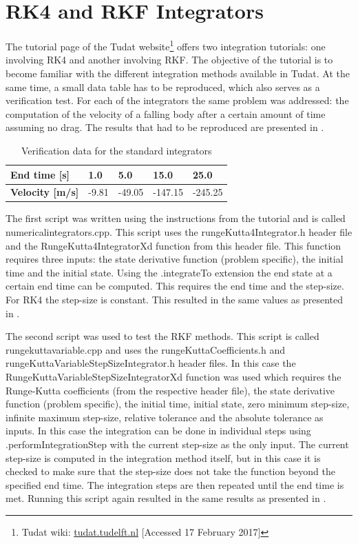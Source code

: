 \section{\acs{RK4} and \acs{RKF} Integrators}
\label{sec:rkandrkfver}
The tutorial page of the \ac{Tudat} website\footnote{\label{foot:tudatWiki2} Tudat wiki: \url{tudat.tudelft.nl} [Accessed 17 February 2017] } offers two integration tutorials: one involving \ac{RK4} and another involving \ac{RKF}. The objective of the tutorial is to become familiar with the different integration methods available in \ac{Tudat}. At the same time, a small data table has to be reproduced, which also serves as a verification test. For each of the integrators the same problem was addressed: the computation of the velocity of a falling body after a certain amount of time assuming no drag. The results that had to be reproduced are presented in .


\begin{table}[H]
\begin{center}
\caption{Verification data for the standard integrators}
\label{tab:intverdat}
\begin{tabular}{|l|l|l|l|l|}
\hline 
\textbf{End time [s]} & 1.0	& 5.0 & 15.0 & 25.0 \\ \hline 
\textbf{Velocity [m/s]} & -9.81 & -49.05 & -147.15 & -245.25 \\ \hline
\end{tabular}
\end{center}
\end{table}

\noindent
The first script was written using the instructions from the tutorial and is called numericalintegrators.cpp. This script uses the rungeKutta4Integrator.h header file and the RungeKutta4IntegratorXd function from this header file. This function requires three inputs: the state derivative function (problem specific), the initial time and the initial state. Using the .integrateTo extension the end state at a certain end time can be computed. This requires the end time and the step-size. For \ac{RK4} the step-size is constant. This resulted in the same values as presented in .


The second script was used to test the \ac{RKF} methods. This script is called rungekuttavariable.cpp and uses the rungeKuttaCoefficients.h and rungeKuttaVariableStepSizeIntegrator.h header files. In this case the RungeKuttaVariableStepSizeIntegratorXd function was used which requires the Runge-Kutta coefficients (from the respective header file), the state derivative function (problem specific), the initial time, initial state, zero minimum step-size, infinite maximum step-size, relative tolerance and the absolute tolerance as inputs. In this case the integration can be done in individual steps using .performIntegrationStep with the current step-size as the only input. The current step-size is computed in the integration method itself, but in this case it is checked to make sure that the step-size does not take the function beyond the specified end time. The integration steps are then repeated until the end time is met. Running this script again resulted in the same results as presented in . \\

